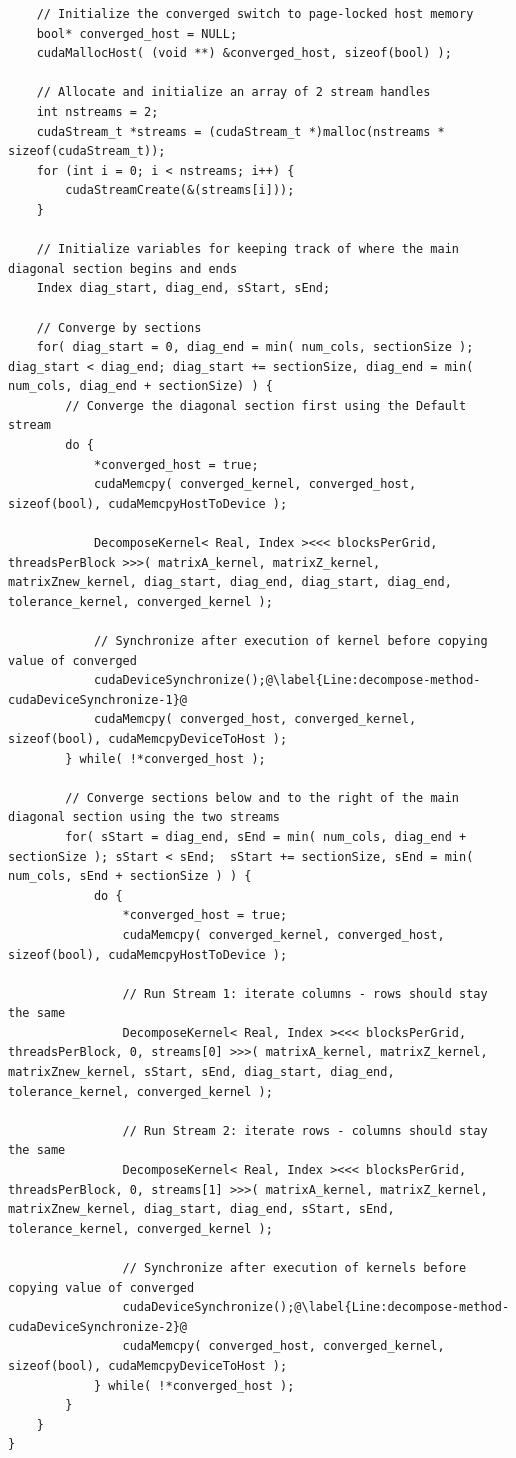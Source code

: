 \begin{lstlisting}
	// Initialize the converged switch to page-locked host memory
	bool* converged_host = NULL;
	cudaMallocHost( (void **) &converged_host, sizeof(bool) );
	
	// Allocate and initialize an array of 2 stream handles
	int nstreams = 2;
	cudaStream_t *streams = (cudaStream_t *)malloc(nstreams * sizeof(cudaStream_t));
	for (int i = 0; i < nstreams; i++) {
		cudaStreamCreate(&(streams[i]));
	}
	
	// Initialize variables for keeping track of where the main diagonal section begins and ends
	Index diag_start, diag_end, sStart, sEnd;
	
	// Converge by sections
	for( diag_start = 0, diag_end = min( num_cols, sectionSize ); diag_start < diag_end; diag_start += sectionSize, diag_end = min( num_cols, diag_end + sectionSize) ) {
		// Converge the diagonal section first using the Default stream
		do {
			*converged_host = true;
			cudaMemcpy( converged_kernel, converged_host, sizeof(bool), cudaMemcpyHostToDevice );
			
			DecomposeKernel< Real, Index ><<< blocksPerGrid, threadsPerBlock >>>( matrixA_kernel, matrixZ_kernel, matrixZnew_kernel, diag_start, diag_end, diag_start, diag_end, tolerance_kernel, converged_kernel );
			
			// Synchronize after execution of kernel before copying value of converged
			cudaDeviceSynchronize();@\label{Line:decompose-method-cudaDeviceSynchronize-1}@
			cudaMemcpy( converged_host, converged_kernel, sizeof(bool), cudaMemcpyDeviceToHost );
		} while( !*converged_host );
		
		// Converge sections below and to the right of the main diagonal section using the two streams
		for( sStart = diag_end, sEnd = min( num_cols, diag_end + sectionSize );	sStart < sEnd;	sStart += sectionSize, sEnd = min( num_cols, sEnd + sectionSize ) ) {
			do {
				*converged_host = true;
				cudaMemcpy( converged_kernel, converged_host, sizeof(bool), cudaMemcpyHostToDevice );
				
				// Run Stream 1: iterate columns - rows should stay the same
				DecomposeKernel< Real, Index ><<< blocksPerGrid, threadsPerBlock, 0, streams[0] >>>( matrixA_kernel, matrixZ_kernel, matrixZnew_kernel, sStart, sEnd, diag_start, diag_end, tolerance_kernel, converged_kernel );
				
				// Run Stream 2: iterate rows - columns should stay the same
				DecomposeKernel< Real, Index ><<< blocksPerGrid, threadsPerBlock, 0, streams[1] >>>( matrixA_kernel, matrixZ_kernel, matrixZnew_kernel, diag_start, diag_end, sStart, sEnd, tolerance_kernel, converged_kernel );
				
				// Synchronize after execution of kernels before copying value of converged
				cudaDeviceSynchronize();@\label{Line:decompose-method-cudaDeviceSynchronize-2}@
				cudaMemcpy( converged_host, converged_kernel, sizeof(bool), cudaMemcpyDeviceToHost );
			} while( !*converged_host );
		}
	}
}
\end{lstlisting}

